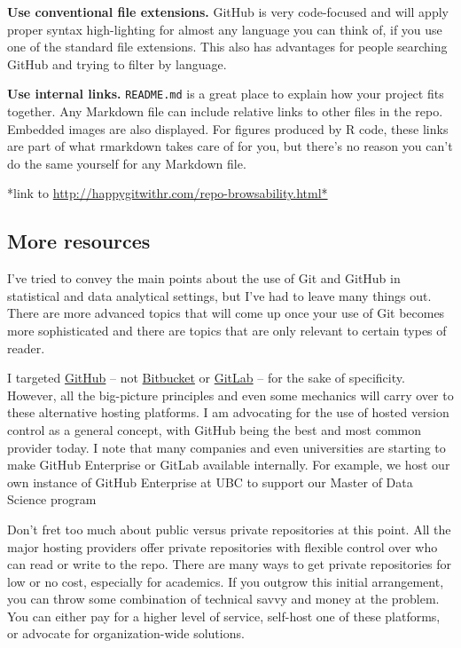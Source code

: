 \documentclass[12pt]{article}
\begin{document}
\textbf{Use conventional file extensions.} GitHub is very code-focused
and will apply proper syntax high-lighting for almost any language you
can think of, if you use one of the standard file extensions. This also
has advantages for people searching GitHub and trying to filter by
language.

\textbf{Use internal links.} \texttt{README.md} is a great place to
explain how your project fits together. Any Markdown file can include
relative links to other files in the repo. Embedded images are also
displayed. For figures produced by R code, these links are part of what
rmarkdown takes care of for you, but there's no reason you can't do the
same yourself for any Markdown file.

*link to \url{http://happygitwithr.com/repo-browsability.html*}

\subsection{More resources}\label{more-resources}

I've tried to convey the main points about the use of Git and GitHub in
statistical and data analytical settings, but I've had to leave many
things out. There are more advanced topics that will come up once your
use of Git becomes more sophisticated and there are topics that are only
relevant to certain types of reader.

I targeted \href{https://github.com}{GitHub} -- not
\href{https://bitbucket.org}{Bitbucket} or
\href{https://about.gitlab.com}{GitLab} -- for the sake of specificity.
However, all the big-picture principles and even some mechanics will
carry over to these alternative hosting platforms. I am advocating for
the use of hosted version control as a general concept, with GitHub
being the best and most common provider today. I note that many
companies and even universities are starting to make GitHub Enterprise
or GitLab available internally. For example, we host our own instance of
GitHub Enterprise at UBC to support our Master of Data Science program

Don't fret too much about public versus private repositories at this
point. All the major hosting providers offer private repositories with
flexible control over who can read or write to the repo. There are many
ways to get private repositories for low or no cost, especially for
academics. If you outgrow this initial arrangement, you can throw some
combination of technical savvy and money at the problem. You can either
pay for a higher level of service, self-host one of these platforms, or
advocate for organization-wide solutions.
\end{document}
